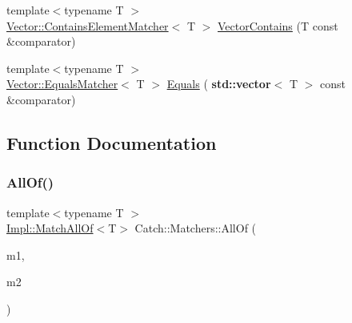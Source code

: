 \begin{DoxyCompactItemize}
{\footnotesize template$<$typename T $>$ }\\\hyperlink{struct_catch_1_1_matchers_1_1_vector_1_1_contains_element_matcher}{Vector\+::\+Contains\+Element\+Matcher}$<$ T $>$ \hyperlink{namespace_catch_1_1_matchers_ae8db5846328116fb36386893deaec944}{Vector\+Contains} (T const \&comparator)
\item 
{\footnotesize template$<$typename T $>$ }\\\hyperlink{struct_catch_1_1_matchers_1_1_vector_1_1_equals_matcher}{Vector\+::\+Equals\+Matcher}$<$ T $>$ \hyperlink{namespace_catch_1_1_matchers_a332a401fb0da33c988e9cfa400ecce1b}{Equals} (\textbf{ std\+::vector}$<$ T $>$ const \&comparator)
\end{DoxyCompactItemize}


\subsection{Function Documentation}
\mbox{\label{namespace_catch_1_1_matchers_ac690851ef8a0a27206cd9cb10e3c2b18}} 
\subsubsection{\texorpdfstring{All\+Of()}{AllOf()}\hspace{0.1cm}{\footnotesize\ttfamily [1/2]}}
{\footnotesize\ttfamily template$<$typename T $>$ \\
\hyperlink{struct_catch_1_1_matchers_1_1_impl_1_1_match_all_of}{Impl\+::\+Match\+All\+Of}$<$T$>$ Catch\+::\+Matchers\+::\+All\+Of (\begin{DoxyParamCaption}\item[{\hyperlink{struct_catch_1_1_matchers_1_1_impl_1_1_matcher_base}{Impl\+::\+Matcher\+Base}$<$ T $>$ const \&}]{m1,  }\item[{\hyperlink{struct_catch_1_1_matchers_1_1_impl_1_1_matcher_base}{Impl\+::\+Matcher\+Base}$<$ T $>$ const \&}]{m2 }\end{DoxyParamCaption})\hspace{0.3cm}{\ttfamily [inline]}}

\mbox{\label{namespace_catch_1_1_matchers_a9cf3bef1efd3453f2528bb16d1ec5048}} 
